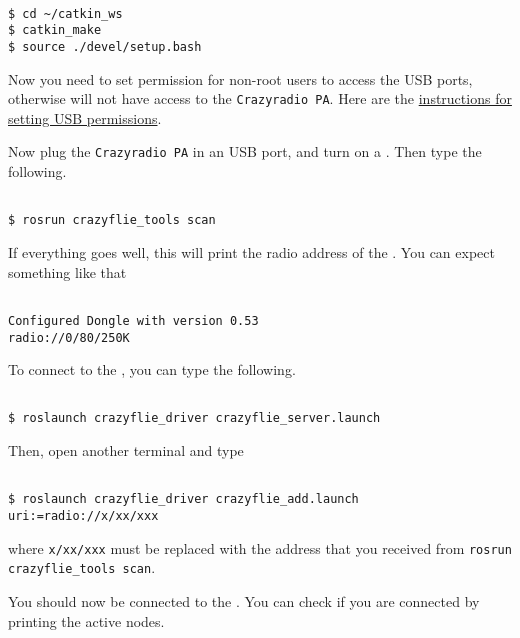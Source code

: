 \begin{Verbatim}[fontsize=\small]

$ cd ~/catkin_ws
$ catkin_make
$ source ./devel/setup.bash

\end{Verbatim}

Now you need to set permission for non-root users to access the USB ports, otherwise \ROS{} will not have access to the \texttt{Crazyradio PA}.
Here are the \href{https://github.com/bitcraze/crazyflie-lib-python#linux}{instructions for setting USB permissions}.

Now plug the \texttt{Crazyradio PA} in an USB port, and turn on a \CF{}.
Then type the following.

\begin{Verbatim}[fontsize=\small]

$ rosrun crazyflie_tools scan

\end{Verbatim}

If everything goes well, this will print the radio address of the \CF{}.
You can expect something like that

\begin{Verbatim}[fontsize=\small]

Configured Dongle with version 0.53
radio://0/80/250K

\end{Verbatim}

To connect to the \CF{}, you can type the following.

\begin{Verbatim}[fontsize=\small]

$ roslaunch crazyflie_driver crazyflie_server.launch

\end{Verbatim}

Then, open another terminal and type

\begin{Verbatim}[fontsize=\small]

$ roslaunch crazyflie_driver crazyflie_add.launch uri:=radio://x/xx/xxx

\end{Verbatim}

where \verb|x/xx/xxx| must be replaced with the address that you received from \verb|rosrun crazyflie_tools scan|.


You should now be connected to the \CF{}.
You can check if you are connected by printing the active \ROS{} nodes.

